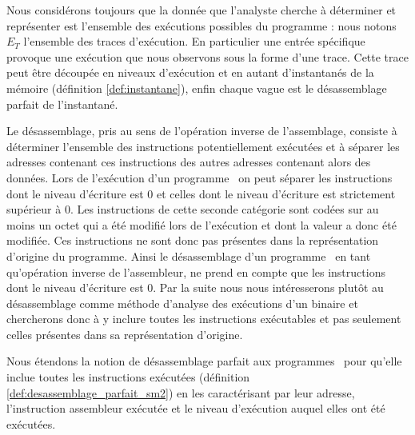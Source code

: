 Nous considérons toujours que la donnée que l'analyste cherche à déterminer et représenter est l'ensemble des exécutions possibles du programme : nous notons $E_T$ l'ensemble des traces d'exécution.
En particulier une entrée spécifique provoque une exécution que nous observons sous la forme d'une trace.
Cette trace peut être découpée en niveaux d'exécution et en autant d'instantanés de la mémoire (définition \ref{def:instantane}), enfin chaque vague est le désassemblage parfait de l'instantané.

Le désassemblage, pris au sens de l'opération inverse de l'assemblage, consiste à déterminer l'ensemble des instructions potentiellement exécutées et à séparer les adresses contenant ces instructions des autres adresses contenant alors des données.
Lors de l'exécution d'un programme \sm\ on peut séparer les instructions dont le niveau d'écriture est 0 et celles dont le niveau d'écriture est strictement supérieur à 0.
Les instructions de cette seconde catégorie sont codées sur au moins un octet qui a été modifié lors de l'exécution et dont la valeur a donc été modifiée. Ces instructions ne sont donc pas présentes dans la représentation d'origine du programme.
Ainsi le désassemblage d'un programme \sm\, en tant qu'opération inverse de l'assembleur, ne prend en compte que les instructions dont le niveau d'écriture est 0.
Par la suite nous nous intéresserons plutôt au désassemblage comme méthode d'analyse des exécutions d'un binaire et chercherons donc à y inclure toutes les instructions exécutables et pas seulement celles présentes dans sa représentation d'origine.

Nous étendons la notion de désassemblage parfait aux programmes \sms\ pour qu'elle inclue toutes les instructions exécutées (définition \ref{def:desassemblage_parfait_sm2}) en les caractérisant par leur adresse, l'instruction assembleur exécutée et le niveau d'exécution auquel elles ont été exécutées.

